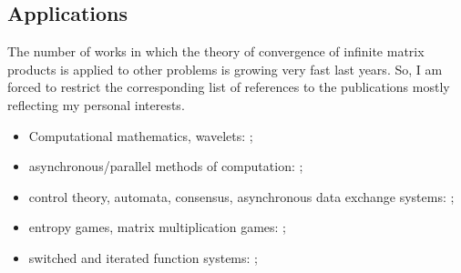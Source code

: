 \subsection*{Applications}
The number of works in which the theory of convergence of infinite matrix products is applied to other problems is growing very fast last years. So, I am forced to restrict the corresponding list of references to the publications mostly reflecting my personal interests.
\begin{itemize}
\item Computational mathematics, wavelets: \cite{BZh:SAIMJMAA00, CCS:AT04, DaubLag:SIAMMAN91, DaubLag:SIAMMAN92, Dumas:LAA13, GugProt:SIAMJMAA16, HStr:LASP92, Jia:ACM95, JLZ:JFAA01, KasBh:2000, Maesumi:TIC95, Maesumi:CMA00};
\item asynchronous/parallel methods of computation: \cite{Baudet:JASSCM78, BertTsi:89, ChM:LAA69, HC:JGO19, FroSpi01, FromSzyld:JCAM00, LubMit:JACM86, Miellow:CRACP74, Miellow:CRACP75, Robert70};
\item control theory, automata, consensus, asynchronous data exchange systems: \cite{AKKK:92:e, AKKKP:88, Bar:CDC05, BGP:ICALP17, BGP:IC20, BokPar:ArXiv13, CHJ:SCL17, CHJ:SIAMJCO15, CzorJurg:Automatica08, CzorNaw:CCA07, CzorNiez:JFI15, Dumas:LAA13, Klep:AIT85:e, KKKK:DAN84:e, KKKK:AiT83:7:e, KKKK:AiT84:3:e, KKKK:AiT84:8:e, KKKK:MCS84, Koz:AiT90:10:e, Koz:AiT90:8:e, Koz:DAN90:311:e, Koz:AiT91:e, Koz:DAN91:e, Koz:BCRI03-13, KozPok:DAN92:e, Koz:ICDEA04, PGBR:IJC11, PhilJung:ICHS15, Shang:FM17, SBKK:CDC97, Wirth:SIAMJCO98, Wirth:MNTS02, Wirth:TR09, Wirth:IFACWC05};
\item entropy games, matrix multiplication games: \cite{ACDDHK:STACS15, GS:MCRF20};
\item switched and iterated function systems: \cite{AGGM:HAL21, AhmJun14, AhmJng:NAHS16, AhmPar:CDC05, AhmJun:CDC13, AKKK:92:e, AKKK:MCM90, ASJ:IEEECSL17, BNT:LNSC04, BV:JGA12, CGM:JDE15, CGP:NAHS18, CGSP:NAHS21, CMS:SCL12, Cong:SCL16, CUH:ECC2020, CzorNiez:MMAR13, Dai:JDE11, Dai:LAA12, Dai:JFI14, DHX:ArXiv11-2, DJM:SCL20, DRD:IEEETAC18, ForValt:IEEETAC12, GCM:CDC13, GLP:FCM15, GS:CDC17, GugProt:AIP16, HLHX:JMAA11, HSZ:IEEETAC09, JP:CDC10, JunMas:SIAMJCO17, KlamCzorNiez:BPASTS13, Koz:INFOPROC16:e, LJP:HSCC16, LPG:SIAM20, MonMarg:AJIFAC11, PEDJ:Autom16, PhilJung:ECC15, Prot:AJIFAC19, OgurJung:CDC14, OgurMart:LAA13, OgurMart:CDC13, OgurMart:ECC13, OPJ:SCL16, PJ:NAHS15, Reber:PhD19, SafKhan:IEEETAC17, Sheipak:MZ98, ShenHu:SIAMJCO12, SWMWK:SIAMREV07, Tuna:AJIFAC08, TW:CDC12, WangYu:14, WangJu:IEEECSL21, WRDV:CDC14, WRDV:IEEETAC16, WuHe:SIAMJCO20, ZhangXu:ArXiv20};

\end{itemize}
